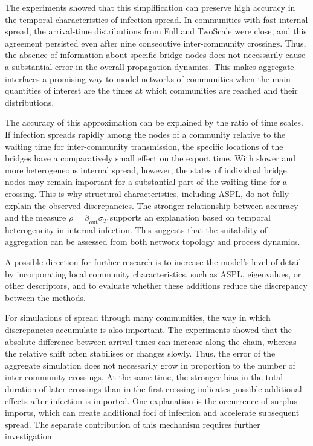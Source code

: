 \documentclass{ieeeaccess}
\newcommand{\Full}{\textup{Full}}
\newcommand{\TS}{\textup{TwoScale}}
\begin{document}
The experiments showed that this simplification can preserve high accuracy in the temporal characteristics of infection spread. In communities with fast internal spread, the arrival-time distributions from \Full{} and \TS{} were close, and this agreement persisted even after nine consecutive inter-community crossings. Thus, the absence of information about specific bridge nodes does not necessarily cause a substantial error in the overall propagation dynamics. This makes aggregate interfaces a promising way to model networks of communities when the main quantities of interest are the times at which communities are reached and their distributions.

The accuracy of this approximation can be explained by the ratio of time scales. If infection spreads rapidly among the nodes of a community relative to the waiting time for inter-community transmission, the specific locations of the bridges have a comparatively small effect on the export time. With slower and more heterogeneous internal spread, however, the states of individual bridge nodes may remain important for a substantial part of the waiting time for a crossing. This is why structural characteristics, including ASPL, do not fully explain the observed discrepancies. The stronger relationship between accuracy and the measure $\rho=\beta_{\mathrm{out}}\sigma_T$ supports an explanation based on temporal heterogeneity in internal infection. This suggests that the suitability of aggregation can be assessed from both network topology and process dynamics.

A possible direction for further research is to increase the model's level of detail by incorporating local community characteristics, such as ASPL, eigenvalues, or other descriptors, and to evaluate whether these additions reduce the discrepancy between the methods.

For simulations of spread through many communities, the way in which discrepancies accumulate is also important. The experiments showed that the absolute difference between arrival times can increase along the chain, whereas the relative shift often stabilises or changes slowly. Thus, the error of the aggregate simulation does not necessarily grow in proportion to the number of inter-community crossings. At the same time, the stronger bias in the total duration of later crossings than in the first crossing indicates possible additional effects after infection is imported. One explanation is the occurrence of surplus imports, which can create additional foci of infection and accelerate subsequent spread. The separate contribution of this mechanism requires further investigation.
\end{document}
